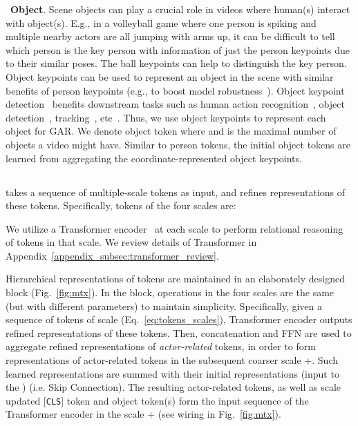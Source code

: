 \documentclass[runningheads]{llncs}
\begin{document}
\noindent \textbullet\ \textbf{Object}. 
Scene objects can
play a crucial role in videos where human(s) interact with object(s).
E.g., in
a volleyball game where one
person 
is spiking and multiple nearby actors are all jumping with arms up, it can be difficult to tell which person is the key person with information of just the person keypoints due to their similar poses.
The ball keypoints can help to distinguish the key person. 
Object keypoints can be used to represent an object in the scene with similar benefits of person keypoints (e.g., to boost model robustness~\cite{jaiswal2021keypoints}). 
Object keypoint detection~\cite{blomqvist2022semi,lu2021few} benefits downstream tasks such as human action recognition~\cite{huangyi}, object detection~\cite{jaiswal2021keypoints,yang2019reppoints}, tracking~\cite{nebehay2014consensus}, etc~\cite{kulkarni2019unsupervised}.
Thus, we use object keypoints to represent each object for GAR.
We denote object token  where  and  is the maximal number of objects a video might have.
Similar to person tokens, the initial object tokens are learned from aggregating the coordinate-represented object keypoints.







 

\subsection{\mtx}
\label{subsec:multiscale_tx}

\mtx takes a sequence of multiple-scale tokens
as input, and refines
representations of these tokens.
Specifically,
tokens of the four scales are:

We utilize a Transformer encoder~\cite{vaswani2017attention} at each scale to perform relational reasoning of tokens in that scale.
We review 
details of
Transformer in Appendix~\ref{appendix_subsec:transformer_review}.


Hierarchical representations of tokens are maintained in an elaborately designed \mtx block (Fig.~\ref{fig:mtx}). In the \mtx block, operations in the four scales are the same (but with different parameters) to maintain simplicity.
Specifically, given a sequence of tokens of scale  (Eq.~\ref{eq:tokens_scales}), Transformer encoder outputs refined representations of these tokens.
Then, concatenation and FFN are used to aggregate refined representations of \textit{actor-related} tokens,
in order to form representations of actor-related tokens in the subsequent coarser scale +. 
Such learned representations
are summed with their initial representations (input to the \mtxeos) (i.e. Skip Connection). 
The resulting 
actor-related tokens, as well as scale  updated {[\texttt{CLS}]} token and object token(s) form the input sequence of the Transformer encoder in the scale + (see wiring in Fig.~\ref{fig:mtx}).
\end{document}
